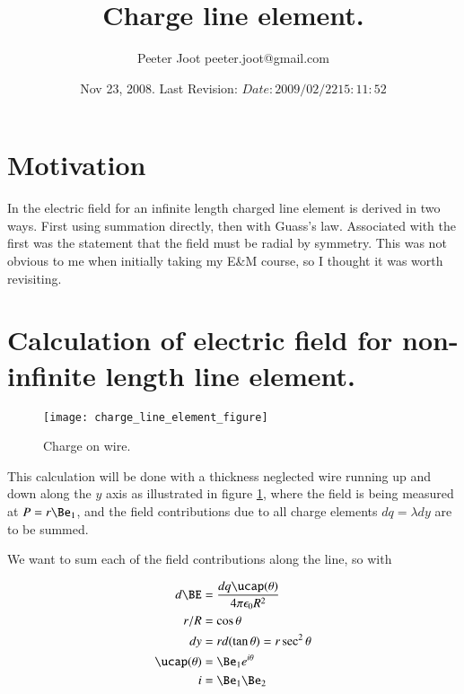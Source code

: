 \documentclass{article}
\title{ Charge line element. }
\author{Peeter Joot \quad peeter.joot@gmail.com}
\date{ Nov 23, 2008.  Last Revision: $Date: 2009/02/22 15:11:52 $ }
\begin{document}
\maketitle{}

\section{Motivation}

In \cite{purcell1963eam} the electric field for an infinite length charged line element is derived in two ways.  First using summation directly, then with Guass's law.  Associated with the first was the statement that the field must be radial by symmetry.  This was not obvious to me when initially taking my E\&M course, so I thought it was worth revisiting.

\section{ Calculation of electric field for non-infinite length line element. }

\begin{figure}[htp]
\centering
\texttt{[image: charge\_line\_element\_figure]}
\caption{Charge on wire.}\label{fig:chargeLineElement}
\end{figure}

This calculation will be done with a thickness neglected wire running up and down along the $y$ axis as illustrated 
in figure \ref{fig:chargeLineElement}, where the field is being measured at $P = r \Be_1$, and the field contributions
due to all charge elements $dq = \lambda dy$ are to be summed.

We want to sum each of the field contributions along the line, so with

\begin{align*}
d\BE &= \frac{dq \ucap(\theta)}{4 \pi \epsilon_0 R^2} \\
r/R &= \cos\theta \\
dy &= r d(\tan\theta) = r \sec^2 \theta \\
\ucap(\theta) &= \Be_1 e^{i \theta} \\
i &= \Be_1 \Be_2 
\end{align*}

%
\end{document}
